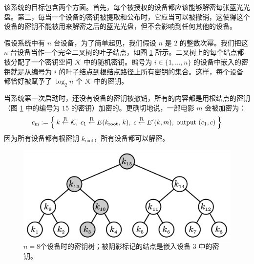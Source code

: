 该系统的目标包含两个方面。首先，每个被授权的设备都应该能够解密每张蓝光光盘。第二，每当一个设备的密钥被提取和公布时，它应当可以被撤销，这使得这个设备的密钥不能被用来解密之后的蓝光光盘，但不会影响到任何其他的设备。

\begin{snote}[一个可撤销的广播系统。]
假设系统中有 $n$ 台设备，为了简单起见，我们假设 $n$ 是 $2$ 的整数次幂。我们把这 $n$ 台设备当作一个完全二叉树的叶子结点，如图 \ref{fig:5-5} 所示。二叉树上的每个结点都被分配了一个密钥空间 $\mathcal{K}$ 中的随机密钥。编号为 $i\in\{1,\dots,n\}$ 的设备中嵌入的密钥就是从编号为 $i$ 的叶子结点到根结点路径上所有密钥的集合。这样，每个设备都恰好被赋予了 $\log_2n$ 个 $\mathcal{K}$ 中的密钥。

当系统第一次启动时，还没有设备的密钥被撤销，所有的内容都是用根结点的密钥（图 \ref{fig:5-5} 中的编号为 $15$ 的密钥）加密的。更确切地说，一部电影 $m$ 会被加密为：
\[
c_\mathrm{m}:=
\left\{
\;
k\overset{\rm R}\leftarrow\mathcal{K},\;
c_1\overset{\rm R}\leftarrow E(k_\mathrm{root},\,k),\;
c\overset{\rm R}\leftarrow E'(k,m),\;
\text{output } (c_1,c)\;
\right\}
\]
因为所有设备都有根密钥 $k_\mathrm{root}$，所有设备都可以解密。
\end{snote}

\begin{figure}
  \centering
  \includegraphics[width=0.45\linewidth]{figures/chapter5/fig5.png}
  \caption{$n=8$个设备时的密钥树；被阴影标记的结点是嵌入设备 $3$ 中的密钥。}
  \label{fig:5-5}
\end{figure}


